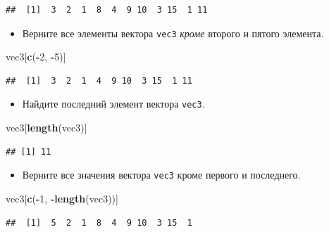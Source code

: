 \documentclass[]{book}
\newenvironment{Shaded}{\begin{snugshade}}{\end{snugshade}}
\newcommand{\KeywordTok}[1]{\textcolor[rgb]{0.13,0.29,0.53}{\textbf{#1}}}
\newcommand{\DecValTok}[1]{\textcolor[rgb]{0.00,0.00,0.81}{#1}}
\newcommand{\OperatorTok}[1]{\textcolor[rgb]{0.81,0.36,0.00}{\textbf{#1}}}
\newcommand{\NormalTok}[1]{#1}
\providecommand{\tightlist}{%
  \setlength{\itemsep}{0pt}\setlength{\parskip}{0pt}}
\begin{document}
\begin{verbatim}
##  [1]  3  2  1  8  4  9 10  3 15  1 11
\end{verbatim}

\begin{itemize}
\tightlist
\item
  Верните все элементы вектора \texttt{vec3} \emph{кроме} второго и
  пятого элемента.
\end{itemize}

\begin{Shaded}
\begin{Highlighting}[]
\NormalTok{vec3[}\KeywordTok{c}\NormalTok{(}\OperatorTok{-}\DecValTok{2}\NormalTok{, }\OperatorTok{-}\DecValTok{5}\NormalTok{)]}
\end{Highlighting}
\end{Shaded}

\begin{verbatim}
##  [1]  3  2  1  4  9 10  3 15  1 11
\end{verbatim}

\begin{itemize}
\tightlist
\item
  Найдите последний элемент вектора \texttt{vec3}.
\end{itemize}

\begin{Shaded}
\begin{Highlighting}[]
\NormalTok{vec3[}\KeywordTok{length}\NormalTok{(vec3)]}
\end{Highlighting}
\end{Shaded}

\begin{verbatim}
## [1] 11
\end{verbatim}

\begin{itemize}
\tightlist
\item
  Верните все значения вектора \texttt{vec3} кроме первого и последнего.
\end{itemize}

\begin{Shaded}
\begin{Highlighting}[]
\NormalTok{vec3[}\KeywordTok{c}\NormalTok{(}\OperatorTok{-}\DecValTok{1}\NormalTok{, }\OperatorTok{-}\KeywordTok{length}\NormalTok{(vec3))]}
\end{Highlighting}
\end{Shaded}

\begin{verbatim}
##  [1]  5  2  1  8  4  9 10  3 15  1
\end{verbatim}
\end{document}
